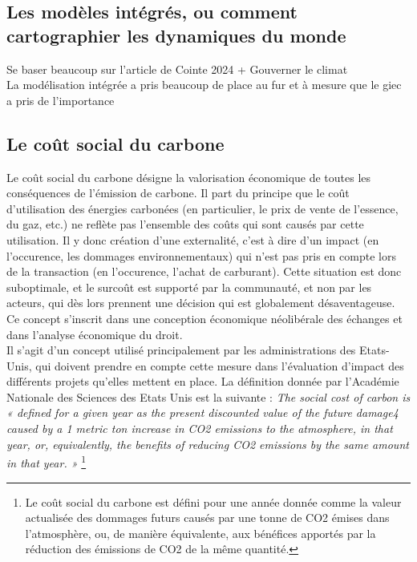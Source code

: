 \subsection{Les modèles intégrés, ou comment cartographier les dynamiques du monde}
\label{sect:1.3.1}

Se baser beaucoup sur l'article de Cointe 2024 + Gouverner le climat \\

La modélisation intégrée a pris beaucoup de place au fur et à mesure que le giec a pris de l'importance

\subsection{Le coût social du carbone}
\label{sect:1.3.2}

Le coût social du carbone désigne la valorisation économique de toutes les conséquences de l'émission de carbone. Il part du principe que le coût d'utilisation des énergies carbonées (en particulier, le prix de vente de l'essence, du gaz, etc.) ne reflète pas l'ensemble des coûts qui sont causés par cette utilisation. Il y donc création d'une externalité, c'est à dire d'un impact (en l'occurence, les dommages environnementaux) qui n'est pas pris en compte lors de la transaction (en l'occurence, l'achat de carburant). Cette situation est donc suboptimale, et le surcoût est supporté par la communauté, et non par les acteurs, qui dès lors prennent une décision qui est globalement désaventageuse. Ce concept s'inscrit dans une conception économique néolibérale des échanges et dans l'analyse économique du droit.  \\

Il s'agit d'un concept utilisé principalement par les administrations des Etats-Unis, qui doivent prendre en compte cette mesure dans l'évaluation d'impact des différents projets qu'elles mettent en place. La définition donnée par l'Académie Nationale des Sciences des Etats Unis est la suivante : \emph{The social cost of carbon is « defined for a given year as the present discounted value of the future damage4 caused by a 1 metric ton increase in CO2 emissions to the atmosphere, in that year, or, equivalently, the benefits of reducing CO2 emissions by the same amount in that year. » }\footnote{Le coût social du carbone est défini pour une année donnée comme la valeur actualisée des dommages futurs causés par une tonne de CO2 émises dans l'atmosphère, ou, de manière équivalente, aux bénéfices apportés par la réduction des émissions de CO2 de la même quantité.} \\

